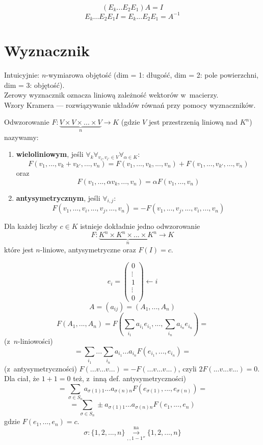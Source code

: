 \begin{dd}
    \[(E_k...E_2E_1)A=I\]
  \[E_k...E_2E_1I=E_k...E_2E_1=A^{-1}\]
\end{dd}

\section{Wyznacznik}
    Intuicyjnie: $n$-wymiarowa objętość (dim = 1: długość, dim = 2: pole powierzchni, dim = 3: objętość). \\
    Zerowy wyznacznik oznacza liniową zależność wektorów w~macierzy. \\
    Wzory Kramera --- rozwiązywanie układów równań przy pomocy wyznaczników.

\begin{df}
    Odwzorowanie
  $F: \underbrace{V \times V \times ... \times V}_{n} \rightarrow K$
  (gdzie $V$ jest przestrzenią liniową nad $K^n$) nazywamy:
  \begin{enumerate}
    \item \textbf{wieloliniowym}, jeśli
      $\forall_k\forall_{v_i,v_{i'}\in V}\forall_{\alpha\in K}$:
      \[F(v_1, ..., v_k+v_{k'}, ..., v_n)
      = F(v_1, ..., v_k, ..., v_n) + F(v_1, ...,v_{k'}, ..., v_n)\]
      oraz
      \[F(v_1, ..., \alpha v_k, ..., v_n) = \alpha F(v_1, ..., v_n)\]
    \item \textbf{antysymetrycznym}, jeśli $\forall_{i,j}$:
      \[F(v_1, ..., v_i, ..., v_j, ..., v_n)
      = -F(v_1, ..., v_j, ..., v_i, ..., v_n)\]
  \end{enumerate}
\end{df}

\begin{tw}
    Dla każdej liczby $c \in K$ istnieje dokładnie jedno odwzorowanie
    \[F: \underbrace{K^n \times K^n \times ... \times K^n}_{n} \rightarrow K\]
    które jest $n$-liniowe, antysymetryczne oraz $F(I) = c$.
\end{tw}

\begin{dd}
    \[e_i=\begin{pmatrix}0\\ \vdots \\1\\ \vdots \\0\end{pmatrix} \leftarrow i\]
  \[A=(a_{ij})=(A_1, ..., A_n)\]
  \[F(A_1, ..., A_n) = F(\sum_{i_1}a_{i_1}e_{i_1}, ..., \sum_{i_n}a_{i_n}e_{i_n}) =\]
  (z~$n$-liniowości)
  \[= \sum_{i_1}...\sum_{i_n}a_{i_1}...a_{i_n}F(e_{i_1}, ..., e_{i_n}) =\]
  (z~antysymetryczności) $F(...v...v...)=-F(...v...v...)$,
  czyli $2F(...v...v...)=0$. Dla ciał, że $1+1=0$ też, z~inną def. antysymetryczności)
  \[= \sum_{\sigma\in S_n}a_{\sigma(1)1}...a_{\sigma(n)n}F(e_{\sigma(1)}, ..., e_{\sigma(n)}) = \]
  \[= \sum_{\sigma\in S_n} \pm a_{\sigma(1)1}...a_{\sigma(n)n}F(e_1, ..., e_n)\]
  gdzie $F(e_1, ..., e_n)=c$.
  \[\sigma: \{1, 2, ..., n\} \overset{\mathrm{na}}{\underset{\mathrm{,,1-1''}}{\longrightarrow}} \{1, 2, ..., n\}\]

\end{dd}

